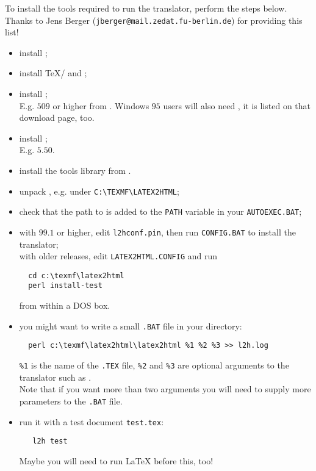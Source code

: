 To install the tools required to run the translator, perform the steps
below. Thanks to Jens Berger (\texttt{jberger@mail.zedat.fu-berlin.de})
for providing this list!
\begin{itemize}
\item install ;
\item install \TeX/\LaTeXe{} and ;
\item install ;\\
   E.g.  $509$ or higher from \ActiveStateURL.
   Windows $95$ users will also need , it is listed on
   that download page, too.
\item install ;\\
    E.g.  $5.50$.
\item install the  tools library from \NetpbmWinURL.
\item unpack \latextohtml{}, e.g. under \verb|C:\TEXMF\LATEX2HTML|;
\item check that the path to  is added to the
  \texttt{PATH} variable in your \texttt{AUTOEXEC.BAT};
\item with \latextohtml{} $99.1$ or higher, edit \texttt{l2hconf.pin},
  then run \texttt{CONFIG.BAT} to install the translator;\\
  with older releases, edit \texttt{LATEX2HTML.CONFIG} and run
  \begin{verbatim}
  cd c:\texmf\latex2html
  perl install-test
  \end{verbatim}
  from within a DOS box.
\item you might want to write a small \texttt{.BAT} file in your
  \latextohtml{} directory:
  \begin{verbatim}
  perl c:\texmf\latex2html\latex2html %1 %2 %3 >> l2h.log
  \end{verbatim}
  \texttt{\%1} is the name of the \texttt{.TEX} file,
  \texttt{\%2} and \texttt{\%3} are optional arguments to the
  translator such as .\\
  Note that if you want more than two arguments you will need
  to supply more parameters to the \texttt{.BAT} file.
\item run it with a test document \texttt{test.tex}:
  \begin{verbatim}
   l2h test
  \end{verbatim}
  Maybe you will need to run \LaTeX{} before this, too!
\end{itemize}


